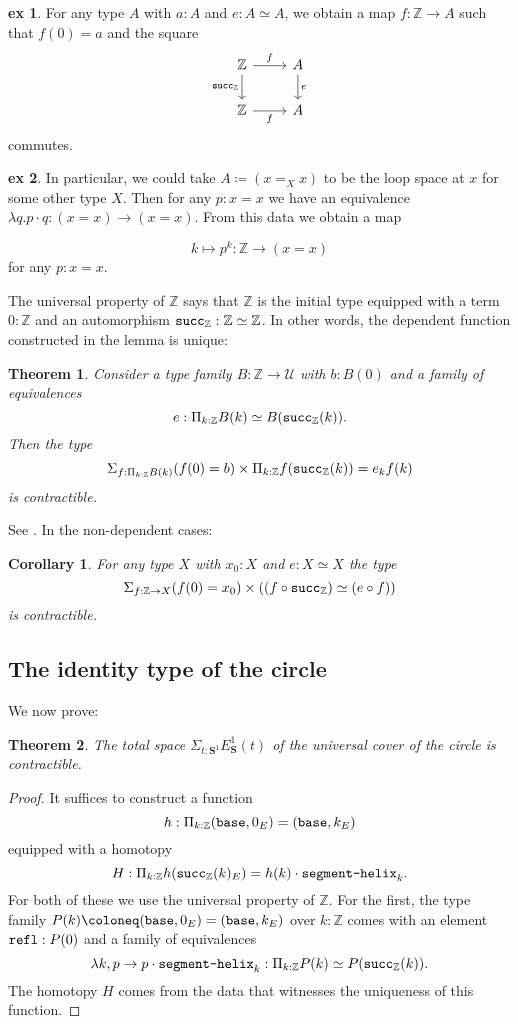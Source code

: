 \documentclass{amsart}
\theoremstyle{theorem}
\newtheorem*{thm}{Theorem}
\newtheorem*{cor}{Corollary}
\theoremstyle{definition}
\newtheorem*{ex}{ex}
\theoremstyle{remark}
\newcommand{\0}{\mathbbe{0}}
\newcommand{\1}{\mathbbe{1}}
\newcommand{\2}{\mathbbe{2}}
\newcommand{\3}{\mathbbe{3}}
\newcommand{\4}{\mathbbe{4}}
\newcommand{\ZZ}{\mathbb{Z}}
\newcommand{\term}[1]{{\textup{\texttt{#1}}}}
\newcommand{\refl}{\term{refl}}
\newcommand{\UU}{{\mathcal{U}}}
\newcommand{\Sone}{\mathbf{S}^1}
\newcommand{\base}{\term{base}}
\begin{document}
\begin{ex} For any type $A$ with $a :A$ and $e : A \simeq A$, we obtain a map $f \colon \ZZ  \to A$ such that $f(0)=a$ and the square
\[
\begin{tikzcd}
 \ZZ \arrow[r, "f"] \arrow[d, "\term{succ}_\ZZ"'] & A \arrow[d, "e"] \\ \ZZ \arrow[r, "f"'] & A
\end{tikzcd}
\]
commutes. 
\end{ex}

\begin{ex}
In particular, we could take $A \coloneq (x =_X x)$ to be the loop space at $x$ for some other type $X$. Then for any $p : x = x$ we have an equivalence $\lambda q. p \cdot q : (x=x) \to (x=x)$. From this data we obtain a map

\[ k \mapsto p^k : \ZZ \to (x=x)\]
for any $p : x=x$.
\end{ex}

The universal property of $\ZZ$ says that $\ZZ$ is the initial type equipped with a term $0 : \ZZ$ and an automorphism $\term{succ}_\ZZ : \ZZ \simeq \ZZ$. In other words, the dependent function constructed in the lemma is unique:

\begin{thm} Consider a type family $B: \ZZ \to \UU$ with $b : B(0)$ and a family of equivalences
\[ e : \Pi_{k : \ZZ} B(k) \simeq B(\term{succ}_\ZZ(k)).\]
Then the type
\[ \Sigma_{f: \Pi_{k: \ZZ} B(k)} (f(0)=b) \times \Pi_{k :\ZZ} f(\term{succ}_\ZZ(k)) = e_kf(k)\]
is contractible.
\end{thm}

See \cite[\S 21.4]{Rijke}. In the non-dependent cases:

\begin{cor} For any type $X$ with $x_0 : X$ and $e : X \simeq X$ the type
\[ \Sigma_{f : \ZZ \to X} (f(0)=x_0) \times ((f \circ \term{succ}_\ZZ) \simeq (e \circ f))\]
is contractible.
\end{cor}

\subsection*{The identity type of the circle}

We now prove:

\begin{thm} The total space $\Sigma_{t : \Sone} E_\Sone(t)$ of the universal cover of the circle is contractible.
\end{thm}
\begin{proof}
It suffices to construct a function
\[ h :  \Pi_{k :\ZZ} (\base,0_E) = (\base,k_E) \]
equipped with a homotopy
\[ H : \Pi_{k : \ZZ} h(\term{succ}_\ZZ(k)_E) = h(k) \cdot \term{segment-helix}_k.\]
For both of these we use the universal property of $\ZZ$. For the first, the type family $P(k) \coloneq (\base,0_E) = (\base,k_E)$ over $k : \ZZ$ comes with an element $\refl : P(0)$ and a family of equivalences
\[ \lambda k,p \to p \cdot \term{segment-helix}_k : \Pi_{k : \ZZ} P(k) \simeq P(\term{succ}_\ZZ(k)).\]
The homotopy $H$ comes from the data that witnesses the uniqueness of this function.
\end{proof}
\end{document}
